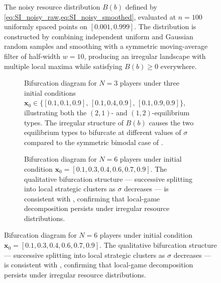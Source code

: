 \documentclass{article}
\begin{document}
                \begin{figure}[ht!]
                    \centering
                        
                    \caption{The noisy resource distribution $B(b)$ defined by \cref{eq:SI_noisy_raw,eq:SI_noisy_smoothed}, evaluated at $n = 100$ uniformly spaced points on $[0.001, 0.999]$. The distribution is constructed by combining independent uniform and Gaussian random samples and smoothing with a symmetric moving-average filter of half-width $w = 10$, producing an irregular landscape with multiple local maxima while satisfying $B(b) \geq 0$ everywhere.}
                \label{fig:noisy_bifurcation:a}
                \end{figure}

                \begin{figure}[ht!]
                    \centering
                    \begin{subfigure}[b]{0.9\linewidth}
                        \centering
                            
                        \caption{Bifurcation diagram for $N = 3$ players under three initial conditions $\mathbf{x}_0 \in \{[0.1, 0.1, 0.9],\,[0.1, 0.4, 0.9],\,[0.1, 0.9, 0.9]\}$, illustrating both the $(2,1)$- and $(1,2)$-equilibrium types. The irregular structure of $B(b)$ causes the two equilibrium types to bifurcate at different values of $\sigma$ compared to the symmetric bimodal case of .}
                    \label{fig:noisy_bifurcation:b}
                    \vspace{4ex}
                    \end{subfigure}
                    \begin{subfigure}[b]{0.9\linewidth}
                        \centering
                            
                        \caption{Bifurcation diagram for $N = 6$ players under initial condition $\mathbf{x}_0 = [0.1, 0.3, 0.4, 0.6, 0.7, 0.9]$. The qualitative bifurcation structure --- successive splitting into local strategic clusters as $\sigma$ decreases --- is consistent with , confirming that local-game decomposition persists under irregular resource distributions. }
                    \label{fig:noisy_bifurcation:c}
                    \vspace{4ex}

\end{subfigure}
\end{figure}
\end{document}
